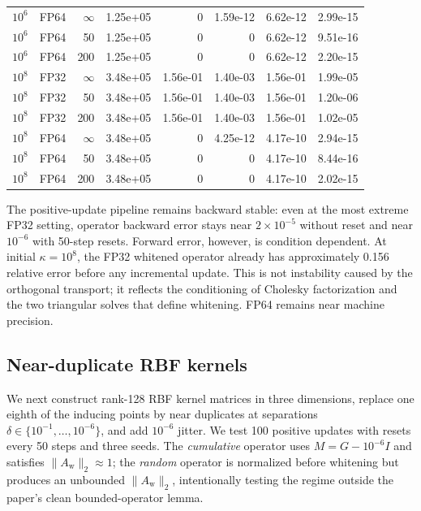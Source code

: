 \documentclass[11pt]{article}
\newcommand{\Aw}{A_{\mathrm w}}
\begin{document}
\begin{landscape}
\begin{longtable}{@{}llrrrrrr@{}}
$10^{6}$ & FP64 & $\infty$ & 1.25e+05 & 0 & 1.59e-12 & 6.62e-12 & 2.99e-15 \\
$10^{6}$ & FP64 & 50 & 1.25e+05 & 0 & 0 & 6.62e-12 & 9.51e-16 \\
$10^{6}$ & FP64 & 200 & 1.25e+05 & 0 & 0 & 6.62e-12 & 2.20e-15 \\
\midrule
$10^{8}$ & FP32 & $\infty$ & 3.48e+05 & 1.56e-01 & 1.40e-03 & 1.56e-01 & 1.99e-05 \\
$10^{8}$ & FP32 & 50 & 3.48e+05 & 1.56e-01 & 1.40e-03 & 1.56e-01 & 1.20e-06 \\
$10^{8}$ & FP32 & 200 & 3.48e+05 & 1.56e-01 & 1.40e-03 & 1.56e-01 & 1.02e-05 \\
$10^{8}$ & FP64 & $\infty$ & 3.48e+05 & 0 & 4.25e-12 & 4.17e-10 & 2.94e-15 \\
$10^{8}$ & FP64 & 50 & 3.48e+05 & 0 & 0 & 4.17e-10 & 8.44e-16 \\
$10^{8}$ & FP64 & 200 & 3.48e+05 & 0 & 0 & 4.17e-10 & 2.02e-15 \\
\bottomrule
\end{longtable}
\end{landscape}

The positive-update pipeline remains backward stable: even at the most
extreme FP32 setting, operator backward error stays near \(2\times10^{-5}\)
without reset and near \(10^{-6}\) with 50-step resets.  Forward error,
however, is condition dependent.  At initial \(\kappa=10^8\), the FP32
whitened operator already has approximately 0.156 relative error before any
incremental update.  This is not instability caused by the orthogonal
transport; it reflects the conditioning of Cholesky factorization and the two
triangular solves that define whitening.  FP64 remains near machine precision.

\subsection{Near-duplicate RBF kernels}

We next construct rank-128 RBF kernel matrices in three dimensions, replace
one eighth of the inducing points by near duplicates at separations
\(\delta\in\{10^{-1},\ldots,10^{-6}\}\), and add \(10^{-6}\) jitter.  We test
100 positive updates with resets every 50 steps and three seeds.  The
\emph{cumulative} operator uses \(M=G-10^{-6}I\) and satisfies
\(\|\Aw\|_2\approx1\); the \emph{random} operator is normalized before
whitening but produces an unbounded \(\|\Aw\|_2\), intentionally testing the
regime outside the paper's clean bounded-operator lemma.
\end{document}
